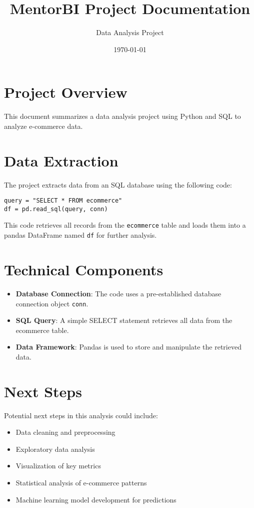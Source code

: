 \documentclass{article}
\title{MentorBI Project Documentation}
\author{Data Analysis Project}
\date{\today}
\begin{document}
\maketitle

\section{Project Overview}
This document summarizes a data analysis project using Python and SQL to analyze e-commerce data.

\section{Data Extraction}
The project extracts data from an SQL database using the following code:

\begin{lstlisting}
query = "SELECT * FROM ecommerce"
df = pd.read_sql(query, conn)
\end{lstlisting}

This code retrieves all records from the \texttt{ecommerce} table and loads them into a pandas DataFrame named \texttt{df} for further analysis.

\section{Technical Components}
\begin{itemize}
  \item \textbf{Database Connection}: The code uses a pre-established database connection object \texttt{conn}.
  \item \textbf{SQL Query}: A simple SELECT statement retrieves all data from the ecommerce table.
  \item \textbf{Data Framework}: Pandas is used to store and manipulate the retrieved data.
\end{itemize}

\section{Next Steps}
Potential next steps in this analysis could include:
\begin{itemize}
  \item Data cleaning and preprocessing
  \item Exploratory data analysis
  \item Visualization of key metrics
  \item Statistical analysis of e-commerce patterns
  \item Machine learning model development for predictions
\end{itemize}
\end{document}
